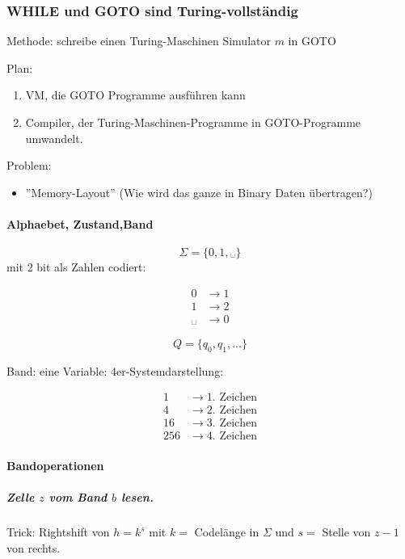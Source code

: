 \subsubsection{WHILE und GOTO sind Turing-vollständig}

Methode: schreibe einen Turing-Maschinen Simulator $m$ in GOTO

Plan: \begin{enumerate}
		\item VM, die GOTO Programme ausführen kann
		\item Compiler, der Turing-Maschinen-Programme in GOTO-Programme umwandelt.
	\end{enumerate}
	
	Problem: \begin{itemize}
		\item ''Memory-Layout'' (Wie wird das ganze in Binary Daten übertragen?)
	\end{itemize}
	
	\paragraph{Alphaebet, Zustand,Band}
	
\[
	\Sigma = \{ 0, 1, \text{␣} \} 
\]
	mit 2 bit als Zahlen codiert:
	
\begin{align*}
	0 &\rightarrow 1 \\
	1 &\rightarrow 2 \\
	\text{␣} &\rightarrow 0
\end{align*}

\[
	Q = \{ q_0, q_1, ... \} 
\]

Band: eine Variable: 4er-Systemdarstellung:

\begin{align*}
	1 &\rightarrow 1. \text{ Zeichen} \\
	4 &\rightarrow 2. \text{ Zeichen} \\
	16 &\rightarrow 3. \text{ Zeichen} \\
	256 &\rightarrow 4. \text{ Zeichen}
\end{align*}

\paragraph{Bandoperationen}

\subparagraph{Zelle $z$ vom Band $b$ lesen.}
Trick: Rightshift von $h = k^s$ mit $k = $ Codelänge in $\Sigma$ und $s = $ Stelle von $z -1$ von rechts.


